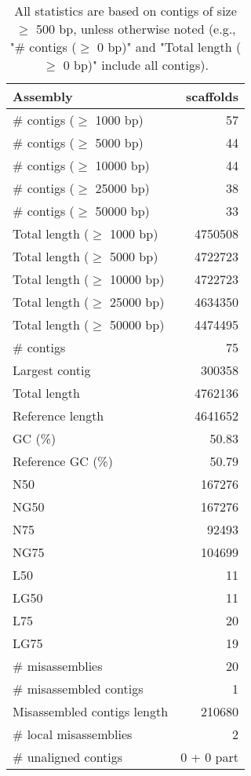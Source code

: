 \documentclass[12pt,a4paper]{article}
\begin{document}
\begin{table}[ht]
\begin{center}
\caption{All statistics are based on contigs of size $\geq$ 500 bp, unless otherwise noted (e.g., "\# contigs ($\geq$ 0 bp)" and "Total length ($\geq$ 0 bp)" include all contigs).}
\begin{tabular}{|l*{1}{|r}|}
\hline
Assembly & scaffolds \\ \hline
\# contigs ($\geq$ 1000 bp) & 57 \\ \hline
\# contigs ($\geq$ 5000 bp) & 44 \\ \hline
\# contigs ($\geq$ 10000 bp) & 44 \\ \hline
\# contigs ($\geq$ 25000 bp) & 38 \\ \hline
\# contigs ($\geq$ 50000 bp) & 33 \\ \hline
Total length ($\geq$ 1000 bp) & 4750508 \\ \hline
Total length ($\geq$ 5000 bp) & 4722723 \\ \hline
Total length ($\geq$ 10000 bp) & 4722723 \\ \hline
Total length ($\geq$ 25000 bp) & 4634350 \\ \hline
Total length ($\geq$ 50000 bp) & 4474495 \\ \hline
\# contigs & 75 \\ \hline
Largest contig & 300358 \\ \hline
Total length & 4762136 \\ \hline
Reference length & 4641652 \\ \hline
GC (\%) & 50.83 \\ \hline
Reference GC (\%) & 50.79 \\ \hline
N50 & 167276 \\ \hline
NG50 & 167276 \\ \hline
N75 & 92493 \\ \hline
NG75 & 104699 \\ \hline
L50 & 11 \\ \hline
LG50 & 11 \\ \hline
L75 & 20 \\ \hline
LG75 & 19 \\ \hline
\# misassemblies & 20 \\ \hline
\# misassembled contigs & 1 \\ \hline
Misassembled contigs length & 210680 \\ \hline
\# local misassemblies & 2 \\ \hline
\# unaligned contigs & 0 + 0 part \\ \hline

\end{tabular}
\end{center}
\end{table}
\end{document}
